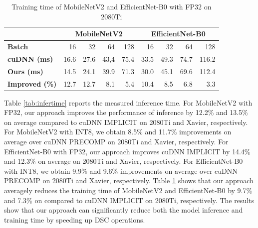 \begin{table}[]
\setlength{\tabcolsep}{4.4pt}
    \caption{Training time of MobileNetV2 and EfficientNet-B0 with FP32 on 2080Ti}
    \vspace{-3mm}
    \label{tab:traintime}
    \centering
    \begin{threeparttable}
    \begin{tabular}{l|rrrr|rrrr}
    \toprule
    &\multicolumn{4}{c|}{MobileNetV2} & \multicolumn{4}{c}{EfficientNet-B0}\\
    \midrule
    \textbf{Batch} & 16& 32 &64 & 128& 16& 32 &64 & 128\\
    \midrule
    \textbf{cuDNN (ms)} & 16.6 & 27.6 & 43,4 &75.4& 33.5 & 49.3 & 74.7 &116.2 \\
    \textbf{Ours (ms)} & 14.5  &24.1 &39.9 &71.3& 30.0  &45.1 &69.6 &112.4\\
    \textbf{Improved (\%)} &12.7  &12.7 &8.1 &5.4 &10.4  &8.5 &6.8 &3.3\\
    \bottomrule
    \end{tabular}
    \footnotesize
    \end{threeparttable}
    \vspace{-5mm}
\end{table}

Table \ref{tab:infertime} reports the measured inference time. For MobileNetV2 with FP32, our approach improves the performance of
inference by 12.2\% and 13.5\% on average compared to cuDNN IMPLICIT on 2080Ti and Xavier, respectively. For MobileNetV2 with INT8, we
obtain 8.5\% and 11.7\% improvements on average over cuDNN PRECOMP on 2080Ti and Xavier, respectively. {\color{red}For EfficientNet-B0 with FP32, our approach improves cuDNN IMPLICIT by 14.4\% and 12.3\% on average on 2080Ti and Xavier, respectively. For EfficientNet-B0 with INT8, we obtain 9.9\% and 9.6\% improvements on average over cuDNN PRECOMP on 2080Ti and Xavier, respectively.}
Table \ref{tab:traintime} shows that
our approach averagely reduces the training time of MobileNetV2 and EfficientNet-B0 by 9.7\% and 7.3\% on compared to cuDNN IMPLICIT on 2080Ti, respectively. The results show that our approach can
significantly reduce both the model inference and training time by speeding up DSC operations.

